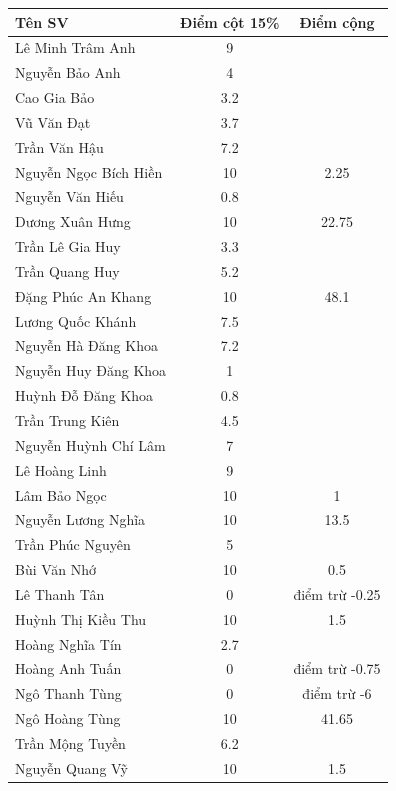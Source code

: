 \documentclass{article}
\begin{document}
\begin{table}[H]
    \centering
    \begin{tabular}{|l|c|c|}
        \hline
        {\bf Tên SV} & {\bf Điểm cột 15\%} & {\bf Điểm cộng} \\
        \hline
        Lê Minh Trâm Anh & 9 &  \\
        \hline
        Nguyễn Bảo Anh & 4 &  \\
        \hline
        Cao Gia Bảo & 3.2 &  \\
        \hline
        Vũ Văn Đạt & 3.7 &  \\
        \hline
        Trần Văn Hậu & 7.2 &  \\
        \hline
        Nguyễn Ngọc Bích Hiền & 10 & 2.25 \\
        \hline
        Nguyễn Văn Hiếu & 0.8 &  \\
        \hline
        Dương Xuân Hưng & 10 & 22.75 \\
        \hline
        Trần Lê Gia Huy & 3.3 &  \\
        \hline
        Trần Quang Huy & 5.2 &  \\
        \hline
        Đặng Phúc An Khang & 10 & 48.1 \\
        \hline
        Lương Quốc Khánh & 7.5 &  \\
        \hline
        Nguyễn Hà Đăng Khoa & 7.2 &  \\
        \hline
        Nguyễn Huy Đăng Khoa & 1 &  \\
        \hline
        Huỳnh Đỗ Đăng Khoa & 0.8 &  \\
        \hline
        Trần Trung Kiên & 4.5 &  \\
        \hline
        Nguyễn Huỳnh Chí Lâm & 7 &  \\
        \hline
        Lê Hoàng Linh & 9 &  \\
        \hline
        Lâm Bảo Ngọc & 10 & 1 \\
        \hline
        Nguyễn Lương Nghĩa & 10 & 13.5 \\
        \hline
        Trần Phúc Nguyên & 5 &  \\
        \hline
        Bùi Văn Nhớ & 10 & 0.5 \\
        \hline
        Lê Thanh Tân & 0 & điểm trừ -0.25 \\
        \hline
        Huỳnh Thị Kiều Thu & 10 & 1.5 \\
        \hline
        Hoàng Nghĩa Tín & 2.7 &  \\
        \hline
        Hoàng Anh Tuấn & 0 & điểm trừ -0.75 \\
        \hline
        Ngô Thanh Tùng & 0 & điểm trừ -6 \\
        \hline
        Ngô Hoàng Tùng & 10 & 41.65 \\
        \hline
        Trần Mộng Tuyền & 6.2 &  \\
        \hline
        Nguyễn Quang Vỹ & 10 & 1.5 \\
        \hline
    \end{tabular}
\end{table}
\end{document}
